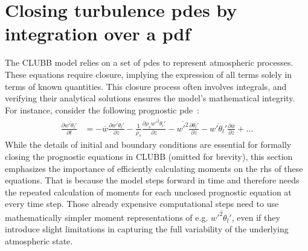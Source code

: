 \section{Closing turbulence pdes by integration over a pdf}
\label{sec:closing-turbulence-pdes-by-integration-over-a-pdf}

The \gls{CLUBB} model relies on a set of \glspl{pde} to represent atmospheric processes.
These equations require closure,
implying the expression of all terms solely in terms of known quantities.
This closure process often involves integrals,
and verifying their analytical solutions ensures the model's mathematical integrity.
For instance, consider the following prognostic \gls{pde}~\autocite[p. 21]{larson2022clubbsilhs}:
\begin{align*}
    \frac{\partial \overline{w'\theta_l'}}{\partial t}
    &= -\overline{w}\frac{\partial \overline{w'\theta_l'}}{\partial z}
    - \frac{1}{\rho_s} \frac{\partial \rho_s \overline{w'^2 \theta_l'}}{\partial z}
    - \overline{w'^2} \frac{\partial \overline{\theta_l'}}{\partial z}
    - \overline{w'\theta_l'} \frac{\partial \overline{w}}{\partial z}
    + \ldots
\end{align*}
While the details of initial and boundary conditions are essential
for formally closing the prognostic equations in \gls{CLUBB} (omitted for brevity),
this section emphasizes the importance of efficiently calculating moments
on the \gls{rhs} of these equations.
That is because the model steps forward in time
and therefore needs the repeated calculation of moments
for each unclosed prognostic equation at every time step.
Those already expensive computational steps need to use mathematically simpler moment representations
of e.g. $\overline{w'^2 \theta_l'}$,
even if they introduce slight limitations
in capturing the full variability of the underlying atmospheric state.